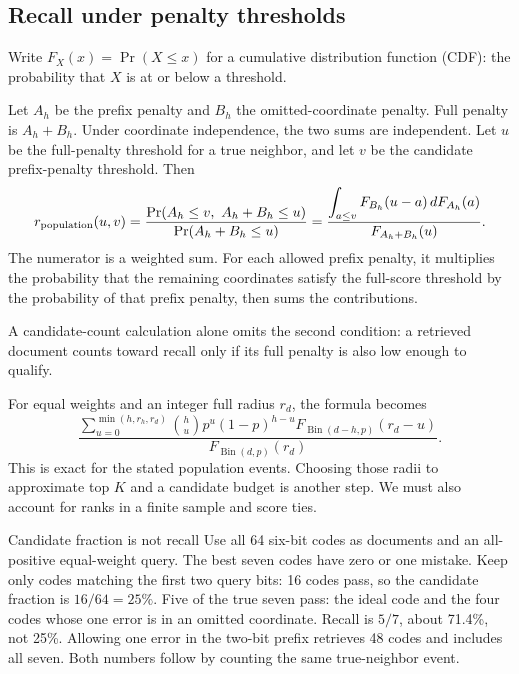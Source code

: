 \subsection{Recall under penalty thresholds}
Write $F_X(x)=\Pr(X\leq x)$ for a cumulative distribution function (CDF): the probability that $X$ is at or below a threshold.

Let $A_h$ be the prefix penalty and $B_h$ the omitted-coordinate penalty. Full penalty is
$A_h+B_h$. Under coordinate independence, the two sums are independent. Let $u$ be the
full-penalty threshold for a true neighbor, and let $v$ be the candidate prefix-penalty threshold. Then
\begin{equation}
r_{\rm population}(u,v)=
\frac{\Pr(A_h\leq v,\ A_h+B_h\leq u)}{\Pr(A_h+B_h\leq u)}
=\frac{\displaystyle\int_{a\leq v}F_{B_h}(u-a)\,dF_{A_h}(a)}
 {F_{A_h+B_h}(u)}.
\label{eq:population-recall}
\end{equation}
The numerator is a weighted sum. For each allowed prefix penalty, it multiplies the probability
that the remaining coordinates satisfy the full-score threshold by the probability of that
prefix penalty, then sums the contributions.

A candidate-count calculation alone omits the second condition: a retrieved document counts
toward recall only if its full penalty is also low enough to qualify.

For equal weights and an integer full radius $r_d$, the formula becomes
\begin{equation}
\frac{\displaystyle\sum_{u=0}^{\min(h,r_h,r_d)}
 \binom{h}{u}p^u(1-p)^{h-u}
 F_{\operatorname{Bin}(d-h,p)}(r_d-u)}
 {F_{\operatorname{Bin}(d,p)}(r_d)}.
\label{eq:binomial-recall}
\end{equation}
This is exact for the stated population events. Choosing those radii to approximate top $K$
and a candidate budget is another step. We must also account for ranks in a finite sample and score ties.

\begin{examplebox}{Candidate fraction is not recall}
Use all 64 six-bit codes as documents and an all-positive equal-weight query. The best seven
codes have zero or one mistake. Keep only codes matching the first two query bits: 16 codes
pass, so the candidate fraction is $16/64=25\%$. Five of the true seven pass: the ideal code
and the four codes whose one error is in an omitted coordinate. Recall is $5/7$, about 71.4\%,
not 25\%. Allowing one error in the two-bit prefix retrieves 48 codes and includes all seven.
Both numbers follow by counting the same true-neighbor event.
\end{examplebox}


